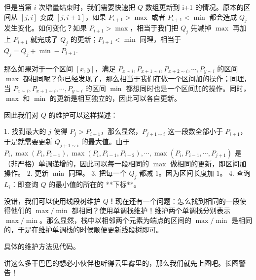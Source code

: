 \documentclass{ctexart}
\begin{document}
但是当第 $i$ 次增量结束时，我们需要快速把 $Q$ 数组更新到 i+1 的情况。原本的区间从 $[j,i]$ 变成 $[j,i+1]$，如果 $P_{i+1}>\max$ 或者 $P_{i+1}<\min$ 都会造成 $Q_j$ 发生变化。如何变化？如果 $P_{i+1}>\max$，相当于我们把 $Q_j$ 先减掉 $\max$ 再加上 $P_{i+1}$ 就完成了 $Q_j$ 的更新；$P_{i+1}<\min$ 同理，相当于 $Q_j=Q_j+\min-P_{i+1}$.

那么如果对于一个区间 $[x,y]$，满足 $P_{x\sim i},P_{x+1\sim i},P_{x+2\sim i},\cdots,P_{y\sim i}$ 的区间 $\max$ 都相同呢？你已经发现了，那么相当于我们在做一个区间加的操作；同理，当 $P_{x\sim i},P_{x+1\sim i},\cdots,P_{y\sim i}$ 的区间 $\min$ 都想同时也是一个区间加的操作。同时，$\max$ 和 $\min$ 的更新是相互独立的，因此可以各自更新。

因此我们对 $Q$ 的维护可以这样描述：

1. 找到最大的 $j$ 使得 $P_{j}>P_{i+1}$，那么显然，$P_{j+1\sim i}$ 这一段数全部小于 $P_{i+1}$，于是就需要更新 $Q_{j+1\sim i}$ 的最大值。由于 $P_{i},\max(P_i,P_{i-1}),\max(P_i,P_{i-1},P_{i-2}),\cdots,\max(P_i,P_{i-1},\cdots,P_{j+1})$ 是（非严格）单调递增的，因此可以每一段相同的 $\max$ 做相同的更新，即区间加操作。
2. 更新 $\min$ 同理。
3. 把每一个 $Q_j$ 都减 $1$。因为区间长度加 $1$。
4. 查询 $L_i$：即查询 $Q$ 的最小值的所在的 **下标**。

没错，我们可以使用线段树维护 $Q$！现在还有一个问题：怎么找到相同的一段使得他们的 $\max/\min$ 都相同？使用单调栈维护！维护两个单调栈分别表示 $\max/\min$。那么显然，栈中以相邻两个元素为端点的区间的 $\max/\min$ 是相同的，于是在维护单调栈的时侯顺便更新线段树即可。

具体的维护方法见代码。

讲这么多干巴巴的想必小伙伴也听得云里雾里的，那么我们就先上图吧。长图警告！
\end{document}
